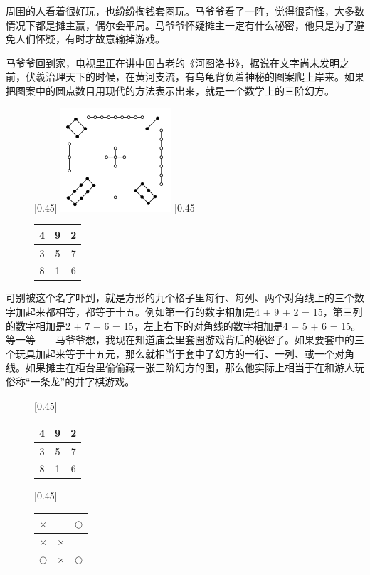\documentclass[UTF8]{article}
\begin{document}
周围的人看着很好玩，也纷纷掏钱套圈玩。马爷爷看了一阵，觉得很奇怪，大多数情况下都是摊主赢，偶尔会平局。马爷爷怀疑摊主一定有什么秘密，他只是为了避免人们怀疑，有时才故意输掉游戏。

马爷爷回到家，电视里正在讲中国古老的《河图洛书》，据说在文字尚未发明之前，伏羲治理天下的时候，在黄河支流，有乌龟背负着神秘的图案爬上岸来。如果把图案中的圆点数目用现代的方法表示出来，就是一个数学上的三阶幻方。

\begin{figure}[htbp]
 \centering
 [0.45\linewidth]{ \includegraphics[scale=0.6]{img/luo-shu.png}}
 [0.45\linewidth]{
   \begin{tabular}{|c|c|c|}
   \hline
   4 & 9 & 2 \\
   \hline
   3 & 5 & 7 \\
   \hline
   8 & 1 & 6 \\
   \hline
   \end{tabular}
   \vspace{8mm}
 }
 \captionsetup{labelformat=empty}
 \caption{}
 \label{fig:luo-shu}
\end{figure}

可别被这个名字吓到，就是方形的九个格子里每行、每列、两个对角线上的三个数字加起来都相等，都等于十五。例如第一行的数字相加是4 + 9 + 2 = 15，第三列的数字相加是2 + 7 + 6 = 15，左上右下的对角线的数字相加是4 + 5 + 6 = 15。等一等——马爷爷想，我现在知道庙会里套圈游戏背后的秘密了。如果要套中的三个玩具加起来等于十五元，那么就相当于套中了幻方的一行、一列、或一个对角线。如果摊主在柜台里偷偷藏一张三阶幻方的图，那么他实际上相当于在和游人玩俗称“一条龙”的井字棋游戏。

\begin{figure}[htbp]
 \centering
 [0.45\linewidth]{
   \begin{tabular}{|c|c|c|}
   \hline
   4 & 9 & 2 \\
   \hline
   3 & 5 & 7 \\
   \hline
   8 & 1 & 6 \\
   \hline
   \end{tabular}
   \vspace{3mm}
 }
 [0.45\linewidth]{
   \begin{tabular}{c|c|c}
   $\times$ &  & $\bigcirc$ \\
   \hline
   $\times$ & $\times$ &  \\
   \hline
   $\bigcirc$ & $\times$ & $\bigcirc$ \\
   \end{tabular}
   \vspace{3mm}
 }
 \captionsetup{labelformat=empty}
 \caption{}
 \label{fig:bingo-magic-square}
\end{figure}
\end{document}
